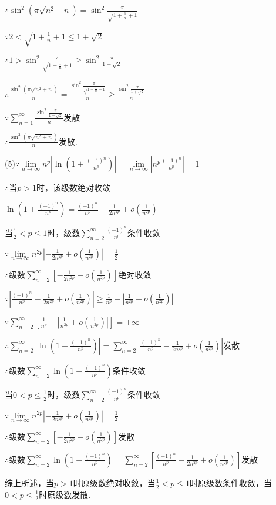 \documentclass[12pt,UTF8]{ctexart}
\newcommand\Lim[0]{\lim\limits_{n\rightarrow\infty}}
\newcommand\Ser[1]{\sum_{n=#1}^\infty}
\newcommand{\varSer}[3]{\sum_{#1=#2}^{#3}}
\begin{document}
\begin{enumerate}
$\therefore\sin^2(\pi\sqrt{n^2+n})=\sin^2\frac{\pi}{\sqrt{1+\frac1n}+1}$

$\because2<\sqrt{1+\frac1n}+1\leq1+\sqrt2$

$\therefore1>\sin^2\frac{\pi}{\sqrt{1+\frac1n}+1}\geq\sin^2\frac{\pi}{1+\sqrt2}$

$\therefore\frac{\sin^2(\pi\sqrt{n^2+n})}n=\frac{\sin^2\frac{\pi}{\sqrt{1+\frac1n}+1}}n\geq\frac{\sin^2\frac{\pi}{1+\sqrt2}}n$

$\because\Ser1\frac{\sin^2\frac{\pi}{1+\sqrt2}}n$发散

$\therefore\frac{\sin^2(\pi\sqrt{n^2+n})}n$发散.

(5)$\because\Lim n^p|\ln(1+\frac{(-1)^n}{n^p})|=\Lim|n^p\frac{(-1)^n}{n^p}|=1$

$\therefore$当$p>1$时，该级数绝对收敛

$\ln(1+\frac{(-1)^n}{n^p})=\frac{(-1)^n}{n^p}-\frac1{2n^{2p}}+o(\frac1{n^{2p}})$

当$\frac12<p\leq1$时，级数$\Ser2\frac{(-1)^n}{n^p}$条件收敛

$\because\Lim n^{2p}|-\frac1{2n^{2p}}+o(\frac1{n^{2p}})|=\frac12$

$\therefore$级数$\Ser2[-\frac1{2n^{2p}}+o(\frac1{n^{2p}})]$绝对收敛

$\because|\frac{(-1)^n}{n^p}-\frac1{2n^{2p}}+o(\frac1{n^{2p}})|\geq\frac1{n^p}-|\frac1{n^{2p}}+o(\frac1{n^{2p}})|$

$\because\Ser2[\frac1{n^p}-|\frac1{n^{2p}}+o(\frac1{n^{2p}})|]=+\infty$

$\therefore\Ser2|\ln(1+\frac{(-1)^n}{n^p})|=\Ser2|\frac{(-1)^n}{n^p}-\frac1{2n^{2p}}+o(\frac1{n^{2p}})|$发散

$\therefore$级数$\Ser2\ln(1+\frac{(-1)^n}{n^p})$条件收敛

当$0<p\leq\frac12$时，级数$\Ser2\frac{(-1)^n}{n^p}$条件收敛

$\because\Lim n^{2p}|-\frac1{2n^{2p}}+o(\frac1{n^{2p}})|=\frac12$

$\therefore$级数$\Ser2[-\frac1{2n^{2p}}+o(\frac1{n^{2p}})]$发散

$\therefore$级数$\Ser2\ln(1+\frac{(-1)^n}{n^p})=\Ser2[\frac{(-1)^n}{n^p}-\frac1{2n^{2p}}+o(\frac1{n^{2p}})]$发散

综上所述，当$p>1$时原级数绝对收敛，当$\frac12<p\leq1$时原级数条件收敛，当$0<p\leq\frac12$时原级数发散.
%
%
%
%
%
%



\end{enumerate}
\end{document}
